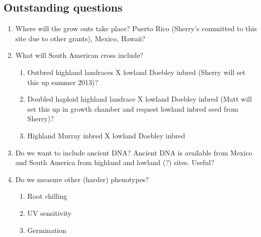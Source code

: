 \documentclass[]{article}
\begin{document}
\subsection*{Outstanding questions}
\begin{enumerate}
	\item Where will the grow outs take place?  Puerto Rico (Sherry’s committed to this site due to other grants), Mexico, Hawaii?

	\item What will South American cross include?  
	\begin{enumerate}

		\item Outbred highland landraces X lowland Doebley inbred (Sherry will set this up summer 2013)? 

		\item Doubled haploid highland landrace X lowland Doebley inbred (Matt will set this up in growth chamber and request lowland inbred seed from Sherry)?

		\item Highland Murray inbred X lowland Doebley inbred
\end{enumerate}

\item  Do we want to include ancient DNA?  Ancient DNA is available from Mexico and South America from highland and lowland (?) sites. Useful?

\item  Do we measure other (harder) phenotypes?
\begin{enumerate}
	\item Root chilling
	\item UV sensitivity
	\item Germination
\end{enumerate}

\end{enumerate}
\end{document}
